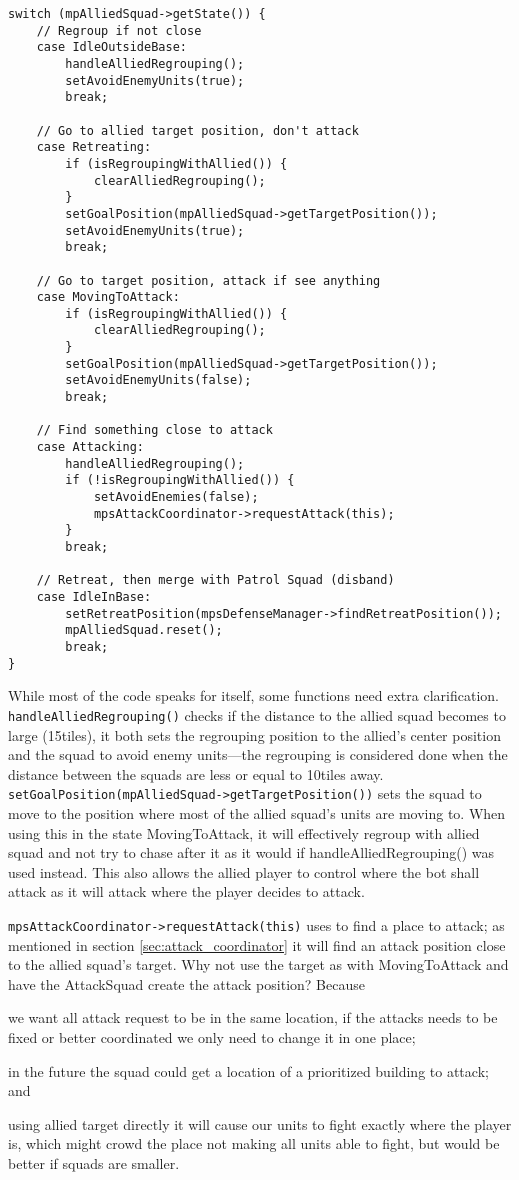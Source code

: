 \begin{lstlisting}[caption={Squad actions depending on the allied squad's state.},label={lst:attack_follow_allied}]
switch (mpAlliedSquad->getState()) {
	// Regroup if not close
	case IdleOutsideBase:
		handleAlliedRegrouping();
		setAvoidEnemyUnits(true);
		break;
	
	// Go to allied target position, don't attack
	case Retreating:
		if (isRegroupingWithAllied()) {
			clearAlliedRegrouping();
		}
		setGoalPosition(mpAlliedSquad->getTargetPosition());
		setAvoidEnemyUnits(true);
		break;

	// Go to target position, attack if see anything
	case MovingToAttack: 
		if (isRegroupingWithAllied()) {
			clearAlliedRegrouping();
		}
		setGoalPosition(mpAlliedSquad->getTargetPosition());
		setAvoidEnemyUnits(false);
		break;

	// Find something close to attack
	case Attacking:
		handleAlliedRegrouping();
		if (!isRegroupingWithAllied()) {
			setAvoidEnemies(false);
			mpsAttackCoordinator->requestAttack(this);
		}
		break;

	// Retreat, then merge with Patrol Squad (disband)
	case IdleInBase:
		setRetreatPosition(mpsDefenseManager->findRetreatPosition());
		mpAlliedSquad.reset();
		break;
}
\end{lstlisting}
While most of the code speaks for itself, some functions need extra clarification. \texttt{handleAlliedRegrouping()} checks if the distance to the allied squad becomes to large (15\conf tiles), it both sets the regrouping position to the allied's center position and the squad to avoid enemy units—the regrouping is considered done when the distance between the squads are less or equal to 10\conf tiles away. \texttt{setGoalPosition(mpAlliedSquad->getTargetPosition())} sets the squad to move to the position where most of the allied squad's units are moving to. When using this in the state MovingToAttack, it will effectively regroup with allied squad and not try to chase after it as it would if handleAlliedRegrouping() was used instead. This also allows the allied player to control where the bot shall attack as it will attack where the player decides to attack.

\texttt{mpsAttackCoordinator->requestAttack(this)} uses  to find a place to attack; as mentioned in section \ref{sec:attack_coordinator} it will find an attack position close to the allied squad's target. Why not use the target as with MovingToAttack and have the AttackSquad create the attack position? Because
\begin{inparaenum}[1\upshape)]
	\item we want all attack request to be in the same location, if the attacks needs to be fixed or better coordinated we only need to change it in one place;
	\item in the future the squad could get a location of a prioritized building to attack; and
	\item using allied target directly it will cause our units to fight exactly where the player is, which might crowd the place not making all units able to fight, but would be better if squads are smaller.
\end{inparaenum}

